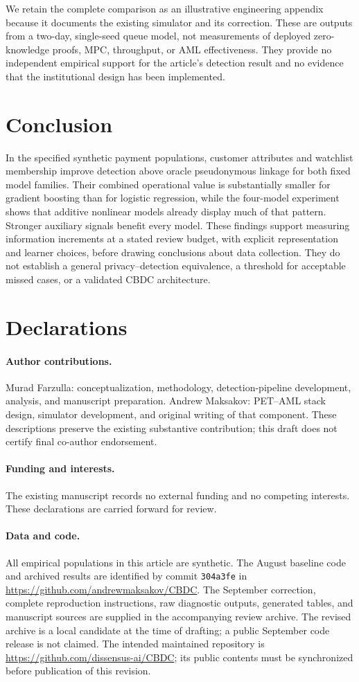 \documentclass[11pt,a4paper]{article}
\begin{document}
We retain the complete comparison as an illustrative engineering appendix because it documents the existing simulator and its correction. These are outputs from a two-day, single-seed queue model, not measurements of deployed zero-knowledge proofs, MPC, throughput, or AML effectiveness. They provide no independent empirical support for the article's detection result and no evidence that the institutional design has been implemented.

\section{Conclusion}
In the specified synthetic payment populations, customer attributes and watchlist membership improve detection above oracle pseudonymous linkage for both fixed model families. Their combined operational value is substantially smaller for gradient boosting than for logistic regression, while the four-model experiment shows that additive nonlinear models already display much of that pattern. Stronger auxiliary signals benefit every model. These findings support measuring information increments at a stated review budget, with explicit representation and learner choices, before drawing conclusions about data collection. They do not establish a general privacy--detection equivalence, a threshold for acceptable missed cases, or a validated CBDC architecture.

\section*{Declarations}
\paragraph{Author contributions.} Murad Farzulla: conceptualization, methodology, detection-pipeline development, analysis, and manuscript preparation. Andrew Maksakov: PET--AML stack design, simulator development, and original writing of that component. These descriptions preserve the existing substantive contribution; this draft does not certify final co-author endorsement.
\paragraph{Funding and interests.} The existing manuscript records no external funding and no competing interests. These declarations are carried forward for review.
\paragraph{Data and code.} All empirical populations in this article are synthetic. The August baseline code and archived results are identified by commit \texttt{304a3fe} in \url{https://github.com/andrewmaksakov/CBDC}. The September correction, complete reproduction instructions, raw diagnostic outputs, generated tables, and manuscript sources are supplied in the accompanying review archive. The revised archive is a local candidate at the time of drafting; a public September code release is not claimed. The intended maintained repository is \url{https://github.com/dissensus-ai/CBDC}; its public contents must be synchronized before publication of this revision.
\end{document}
